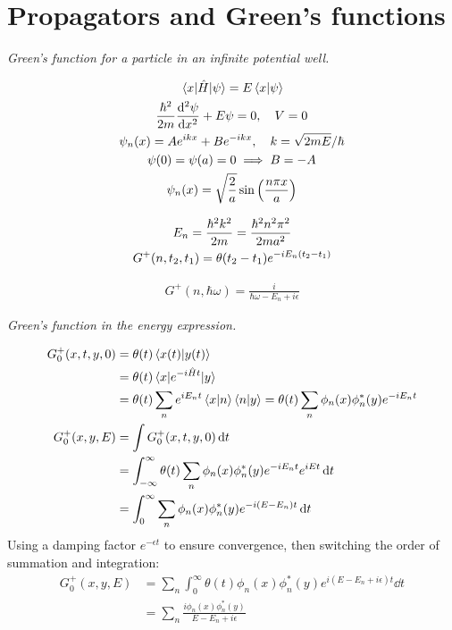 \documentclass{report}
\begin{document}
\chapter{Propagators and Green's functions}
\begin{subquests}
	\item \emph{Green's function for a particle in an infinite potential well.}
	\begin{subquests}
		\item
		\begin{gather*}
			\mel{x}{\hat{H}}{\psi} = E\braket{x}{\psi} \\
			\frac{\hbar^2}{2m}\dv[2]{\psi}{x} + E{\psi} = 0, \quad V = 0 \\
			\psi_n(x) = Ae^{ikx} + Be^{-ikx},\quad k = \sqrt{2mE}/\hbar \\
			\psi(0) = \psi(a) = 0 \implies B = -A \\
			\psi_n(x) = \sqrt{\frac{2}{a}}\sin\pqty{\frac{n\pi x}{a}}
		\end{gather*}

		\item
		\begin{gather*}
			E_n = \frac{\hbar^2k^2}{2m} = \frac{\hbar^2n^2\pi^2}{2ma^2} \\
			G^+(n,t_2,t_1) = \theta(t_2 - t_1)e^{-iE_n\pqty{t_2 - t_1}}
		\end{gather*}

		\item
		\begin{gather*}
			G^+(n,\hbar\omega) = \frac{i}{\hbar\omega - E_n + i\epsilon}
		\end{gather*}
	\end{subquests}
	\newpage
	\item \emph{Green's function in the energy expression.}
	\begin{subquests}
		\item 
		\begin{align*}
			G^+_0(x,t,y,0) & = \theta(t)\ip{x(t)}{y(t)} \\
			& = \theta(t)\mel{x}{e^{-i\hat Ht}}{y} \\
			& = \theta(t)\sum_n e^{iE_n t}\ip{x}{n}\ip{n}{y} = \theta(t)\sum_n\phi_{n}(x)\phi_n^*(y)e^{-iE_n t} \\
			G^+_0(x,y,E) & = \int G^+_0(x,t,y,0) \dd{t} \\
			& = \int_{-\infty}^{\infty} \theta(t)\sum_n\phi_{n}(x)\phi_n^*(y)e^{-iE_n t}e^{iEt} \dd{t} \\
			& = \int_{0}^{\infty} \sum_n\phi_{n}(x)\phi_n^*(y)e^{-i(E-E_n)t} \dd{t}
		\end{align*}
		Using a damping factor $e^{-\epsilon t}$ to ensure convergence, then switching the order of summation and integration:
		\begin{align*}
			G^+_0(x,y,E) & = \sum_n\int_{0}^{\infty} \theta(t)\phi_{n}(x)\phi_n^*(y)e^{i(E - E_n + i\epsilon)t} \dd{t}\\
			& = \sum_n \frac{i\phi_{n}(x)\phi_n^*(y)}{E - E_n + i\epsilon}
		\end{align*}
		

\end{subquests}
\end{subquests}
\end{document}
